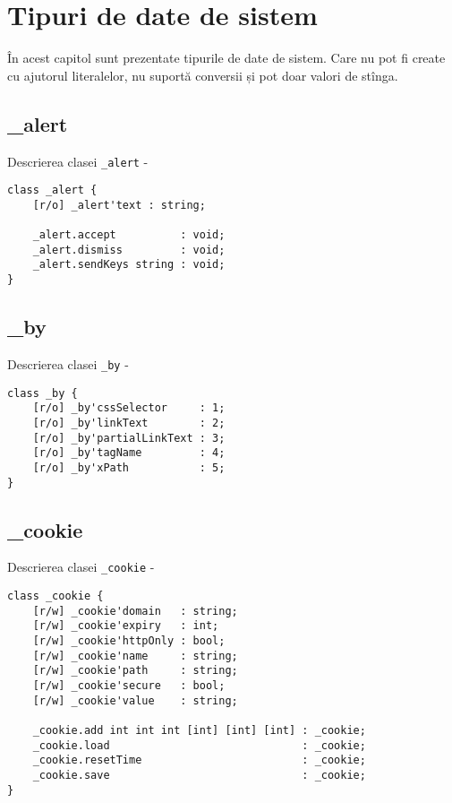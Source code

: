 \section{Tipuri de date de sistem}

În acest capitol sunt prezentate tipurile de date de sistem. Care nu pot fi create cu ajutorul literalelor, nu suportă conversii și pot doar valori de stînga.

\subsection{{\color{orange} \_alert}}

\noindent Descrierea clasei \texttt{\_alert} -
\begin{verbatim}
class _alert {
	[r/o] _alert'text : string;
	
	_alert.accept          : void;
	_alert.dismiss         : void;
	_alert.sendKeys string : void;
}
\end{verbatim}

\subsection{{\color{orange} \_by}}

\noindent Descrierea clasei \texttt{\_by} -
\begin{verbatim}
class _by {
	[r/o] _by'cssSelector     : 1;
	[r/o] _by'linkText        : 2;
	[r/o] _by'partialLinkText : 3;
	[r/o] _by'tagName         : 4;
	[r/o] _by'xPath           : 5;
}
\end{verbatim}

\subsection{{\color{orange} \_cookie}}

\noindent Descrierea clasei \texttt{\_cookie} -
\begin{verbatim}
class _cookie {
	[r/w] _cookie'domain   : string;
	[r/w] _cookie'expiry   : int;
	[r/w] _cookie'httpOnly : bool;
	[r/w] _cookie'name     : string;
	[r/w] _cookie'path     : string;
	[r/w] _cookie'secure   : bool;
	[r/w] _cookie'value    : string;
	
	_cookie.add int int int [int] [int] [int] : _cookie;
	_cookie.load                              : _cookie;
	_cookie.resetTime                         : _cookie;
	_cookie.save                              : _cookie;
}
\end{verbatim}

